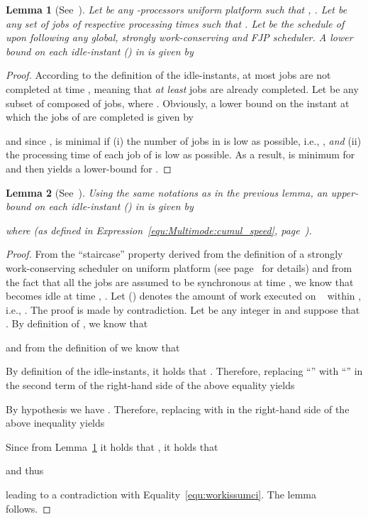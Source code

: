 \documentclass{article}
\newtheorem{validity test}{Validity Test}
\newtheorem{Lemma}{Lemma}
\newtheorem{proof}{Proof}
\begin{document}
\begin{Lemma}[See~\cite{MeumeuNelisGoossens:10}]
\label{lem:Multimode:unif_FJP_minidle}
Let  be any -processors uniform platform such that  , . Let  be any set of  jobs of respective processing times  such that . Let  be the schedule of  upon  following any global, strongly work-conserving and FJP scheduler. A lower bound  on each idle-instant  () in  is given by

\end{Lemma} 
\begin{proof}
According to the definition of the idle-instants, at most  jobs are not completed at time , meaning that \emph{at least}  jobs are already completed. Let  be any subset of  composed of  jobs, where . Obviously, a lower bound  on the instant at which the  jobs of  are completed is given by 

and since ,  is minimal if (i) the number of jobs in  is low as possible, i.e., , \emph{and} (ii) the processing time of each job of  is low as possible. As a result,  is minimum for  and then yields a lower-bound for . 
\end{proof}

\begin{Lemma}[See~\cite{MeumeuNelisGoossens:10}]
\label{lem:Multimode:unif_FJP_maxidle}
Using the same notations as in the previous lemma, an upper-bound  on each idle-instant  () in  is given by

where  (as defined in Expression~\ref{equ:Multimode:cumul_speed}, page~\pageref{equ:Multimode:cumul_speed}).
\end{Lemma} 
\begin{proof}
From the ``staircase'' property derived from the definition of a strongly work-conserving scheduler on uniform platform (see page~\pageref{sec:Multimode:scheduler_specifications} for details) and from the fact that all the jobs are assumed to be synchronous at time , we know that   becomes idle at time , . Let  () denotes the amount of work executed on ~ within , i.e., . The proof is made by contradiction. Let  be any integer in  and suppose that . By definition of , we know that 

and from the definition of  we know that 

By definition of the idle-instants, it holds  that . Therefore, replacing ``'' with ``'' in the second term of the right-hand side of the above equality yields

By hypothesis we have . Therefore, replacing  with  in the right-hand side of the above inequality yields
\begin{small}

\end{small}
\noindent Since from Lemma~\ref{lem:Multimode:unif_FJP_minidle} it holds that  , it holds that 

and thus
 
leading to a contradiction with Equality~\ref{equ:workissumci}. The lemma follows. 
\end{proof}
\end{document}
